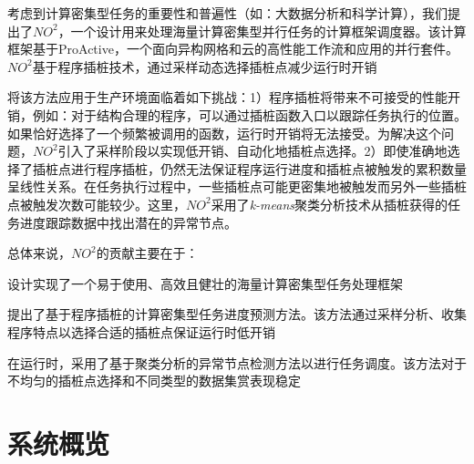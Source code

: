 考虑到计算密集型任务的重要性和普遍性（如：大数据分析和科学计算），我们提出了$NO^2$，一个设计用来处理海量计算密集型并行任务的计算框架调度器。该计算框架基于ProActive，一个面向异构网格和云的高性能工作流和应用的并行套件。$NO^2$基于程序插桩技术，通过采样动态选择插桩点减少运行时开销

将该方法应用于生产环境面临着如下挑战：1）程序插桩将带来不可接受的性能开销，例如：对于结构合理的程序，可以通过插桩函数入口以跟踪任务执行的位置。如果恰好选择了一个频繁被调用的函数，运行时开销将无法接受。为解决这个问题，$NO^2$引入了采样阶段以实现低开销、自动化地插桩点选择。2）即使准确地选择了插桩点进行程序插桩，仍然无法保证程序运行进度和插桩点被触发的累积数量呈线性关系。在任务执行过程中，一些插桩点可能更密集地被触发而另外一些插桩点被触发次数可能较少。这里，$NO^2$采用了\emph{k-means}聚类分析技术从插桩获得的任务进度跟踪数据中找出潜在的异常节点。

总体来说，$NO^2$的贡献主要在于：

设计实现了一个易于使用、高效且健壮的海量计算密集型任务处理框架

提出了基于程序插桩的计算密集型任务进度预测方法。该方法通过采样分析、收集程序特点以选择合适的插桩点保证运行时低开销

在运行时，采用了基于聚类分析的异常节点检测方法以进行任务调度。该方法对于不均匀的插桩点选择和不同类型的数据集赏表现稳定

\section{系统概览}
\label{sec:gemini_overview}
